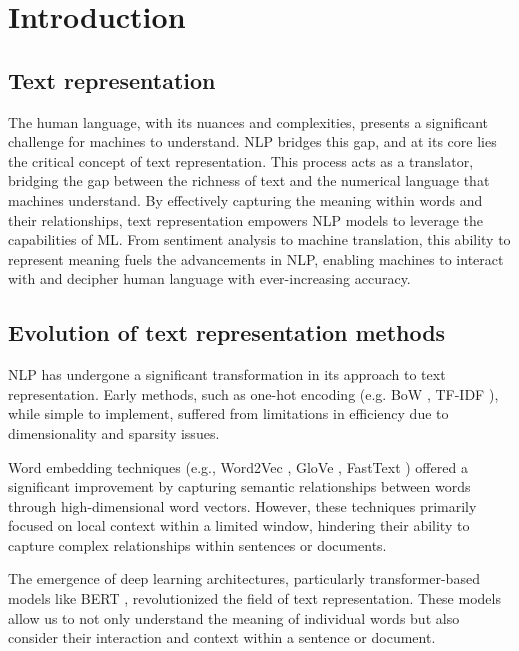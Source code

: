 
\chapter{Introduction\label{chap:introduction}}

\section{Text representation}
The human language, with its nuances and complexities, presents a significant challenge for machines to understand.
\ac{NLP} bridges this gap, and at its core lies the critical concept of text representation.
This process acts as a translator, bridging the gap between the richness of text and the numerical language that machines understand.
By effectively capturing the meaning within words and their relationships, text representation empowers \ac{NLP} models to leverage the capabilities of \ac{ML}.
From sentiment analysis to machine translation, this ability to represent meaning fuels the advancements in \ac{NLP}, enabling machines to interact with and decipher human language with ever-increasing accuracy.

\section{Evolution of text representation methods}

\ac{NLP} has undergone a significant transformation in its approach to text representation.
Early methods, such as one-hot encoding (e.g. \ac{BoW} \cite{wiki_BoW}, \ac{TF-IDF} \cite{wiki_tf_idf}), while simple to implement, suffered from limitations in efficiency due to dimensionality and sparsity issues.

Word embedding techniques (e.g., Word2Vec \cite{mikolov2013efficient}, \ac{GloVe} \cite{pennington2014glove}, FastText \cite{bojanowski2017enriching}) offered a significant improvement by capturing semantic relationships between words through high-dimensional word vectors.
However, these techniques primarily focused on local context within a limited window, hindering their ability to capture complex relationships within sentences or documents.

The emergence of deep learning architectures, particularly transformer-based models like \ac{BERT} \cite{vaswani2023attention}, revolutionized the field of text representation.
These models allow us to not only understand the meaning of individual words but also consider their interaction and context within a sentence or document.

